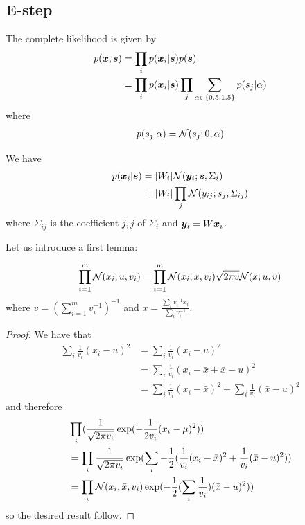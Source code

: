   \subsection{E-step}
  \label{app:emestep1}
  The complete likelihood is given by
\begin{align}
  p(\boldsymbol{x}, \boldsymbol{s}) &= \prod_i p(\boldsymbol{x}_i | \boldsymbol{s}) p(\boldsymbol{s}) \\
  &= \prod_i p(\boldsymbol{x}_i | \boldsymbol{s}) \prod_j \sum_{\alpha \in \{0.5, 1.5\}}p(s_j | \alpha) \\
\end{align}
where 
\begin{align}
  p(s_j | \alpha) = \mathcal{N}(s_j; 0, \alpha)
\end{align}

We have
\begin{align}
  p(\boldsymbol{x}_i | \boldsymbol{s}) &=|W_i|\mathcal{N}(\boldsymbol{y}_i; \boldsymbol{s}, \Sigma_i)  \\
                  &= |W_i| \prod_j \mathcal{N}(y_{ij}; s_j, \Sigma_{ij})
\end{align}
where $\Sigma_{ij}$ is the coefficient $j, j$ of $\Sigma_i$ and $\boldsymbol{y}_i = W \boldsymbol{x}_i$.

Let us introduce a first lemma:
\begin{lemma}
  \label{lemma:multmgauss}
  \begin{align*}
    \prod_{i=1}^m \mathcal{N}(x_i; u, v_i) = \prod_{i=1}^m \mathcal{N}(x_i; \bar{x}, v_i) \sqrt{2 \pi \bar{v}} \mathcal{N}(\bar{x}; u, \bar{v})
  \end{align*}
  where $\bar{v} = (\sum_{i=1}^m v_i^{-1})^{-1}$ and $\bar{x} = \frac{\sum_i v_i^{-1}
    x_i}{\sum_i v_i^{-1}}$.
\end{lemma}
\begin{proof}
  We have that
  \begin{align}
    \sum_i \frac1{v_i}(x_i - u)^2 &= \sum_i\frac1{v_i}(x_i - u)^2 \\
                                  &= \sum_i \frac1{v_i}(x_i - \bar{x} + \bar{x} - u)^2 \\
                                  &= \sum_i \frac1{v_i}(x_i - \bar{x})^2 + \sum_i \frac1{v_i}(\bar{x} - u)^2 \label{eq:lem:multigauss}
  \end{align}
  and therefore
  \begin{align}
    &\prod_i (\frac1{\sqrt{2 \pi v_i}}\exp(-\frac1{2v_i}(x_i - \mu)^2)) \\
    &= \prod_i \frac1{\sqrt{2 \pi v_i}}\exp(\sum_i -\frac12 (\frac1{v_i}(x_i - \bar{x})^2 + \frac1{v_i}(\bar{x} - u)^2)) \\ 
    &= \prod_i \mathcal{N}(x_i, \bar{x}, v_i) \exp(-\frac12( \sum_i \frac1{v_i})(\bar{x} - u)^2)) \\ 
  \end{align}
    so the desired result follow.
\end{proof}

